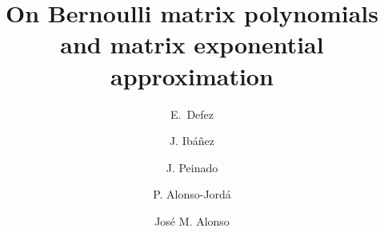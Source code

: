 \documentclass[preprint,10pt]{elsarticle}
\begin{document}

\begin{frontmatter}



\title{On Bernoulli matrix polynomials and matrix exponential approximation }


\author[imm]{E.~Defez}
\author[i3m]{J. Ib\'a\~nez}
\author[dsic]{J. Peinado}
\author[grupo]{P. Alonso-Jord\'{a}}

\author[i3m]{Jos\'e M. Alonso}
\address[imm]{Instituto de Matem\'{a}tica Multidisciplinar}
\address[i3m]{Instituto de Instrumentaci\'{o}n para Imagen Molecular}
\address{Universitat Polit\`{e}cnica de Val\`{e}ncia, Camino de Vera s/n, 46022, Valencia. Spain}
\address[grupo]{Grupo Interdisciplinar de Computaci\'on y Comunicaciones.}
\address[dsic]{Departamento Sistemas Inform\'aticos y Computaci\'on.}


\end{frontmatter}
\end{document}
